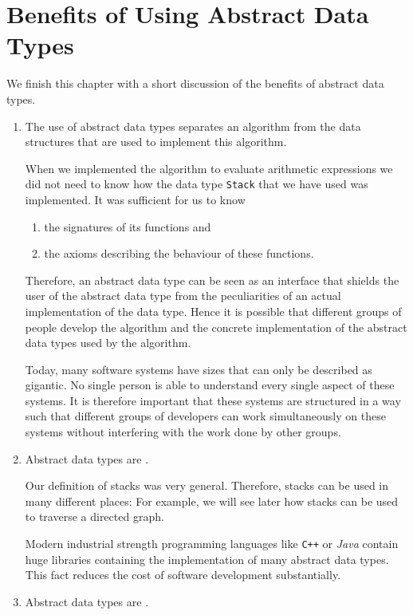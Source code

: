 \section[Benefits of Abstract Data Types]{Benefits of Using Abstract Data Types}
We finish this chapter with a short discussion of the benefits of abstract data types.
 \begin{enumerate}
 \item The use of abstract data types separates an algorithm from the data structures that
       are used to implement this algorithm.

       When we implemented the algorithm to evaluate arithmetic expressions we did not need to know
       how the data type \texttt{Stack} that we have used was implemented.  It was sufficient for us to know 
       \begin{enumerate}
       \item the signatures of its functions and
       \item the axioms describing the behaviour of these functions.
       \end{enumerate}
       Therefore, an abstract data type can be seen as an interface that shields the user of the
       abstract data type from the peculiarities of an actual implementation of the data type.
       Hence it is possible that different groups of people develop the algorithm and the
       concrete implementation of the abstract data types used by the algorithm.  

       Today, many software systems have sizes that can only be described as gigantic.  No single
       person is able to understand every single aspect of these systems.  It is therefore important
       that these systems are structured in a way such that different groups of developers can work
       simultaneously on these systems without interfering with the work done by other groups.
 \item Abstract data types are .

       Our definition of stacks was very general.  Therefore, stacks can be used in many different
       places:  For example, we will see later how stacks can be used to traverse a directed graph.

       Modern industrial strength programming languages like \texttt{C++} or \textsl{Java} contain
       huge libraries containing the implementation of many abstract data types.  This fact reduces
       the cost of software development substantially.     
 \item Abstract data types are .


\end{enumerate}
